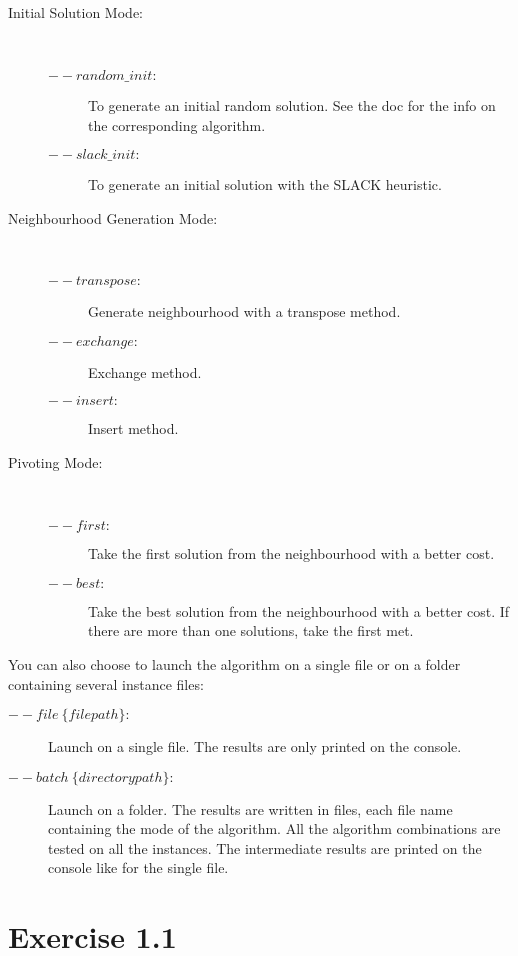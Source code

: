 \begin{description}
	\item[Initial Solution Mode:]~
		\begin{description}
		\item[$--random\_init:$] To generate an initial random solution. See the doc for the info on the corresponding algorithm.
		\item[$--slack\_init:$] To generate an initial solution with the SLACK heuristic.
		\end{description}
		
	\item[Neighbourhood Generation Mode:]~
		\begin{description}
		\item[$--transpose:$] Generate neighbourhood with a transpose method.
		\item[$--exchange:$] Exchange method.
		\item[$--insert:$] Insert method.
		\end{description}
		
	\item[Pivoting Mode:]~
		\begin{description}
		\item[$--first:$] Take the first solution from the neighbourhood with a better cost.
		\item[$--best:$] Take the best solution from the neighbourhood with a better cost. If there are more than one solutions, take the first met.
		\end{description}
		
\end{description}

You can also choose to launch the algorithm on a single file or on a folder containing several instance files:
\begin{description}
	\item[$--file ~\{filepath\}:$] Launch on a single file. The results are only printed on the console.
	\item[$--batch ~\{directory path\}:$] Launch on a folder. The results are written in files, each file name containing the mode of the algorithm. All the algorithm combinations are tested on all the instances. The intermediate results are printed on the console like for the single file.
\end{description}

\section{Exercise 1.1}

